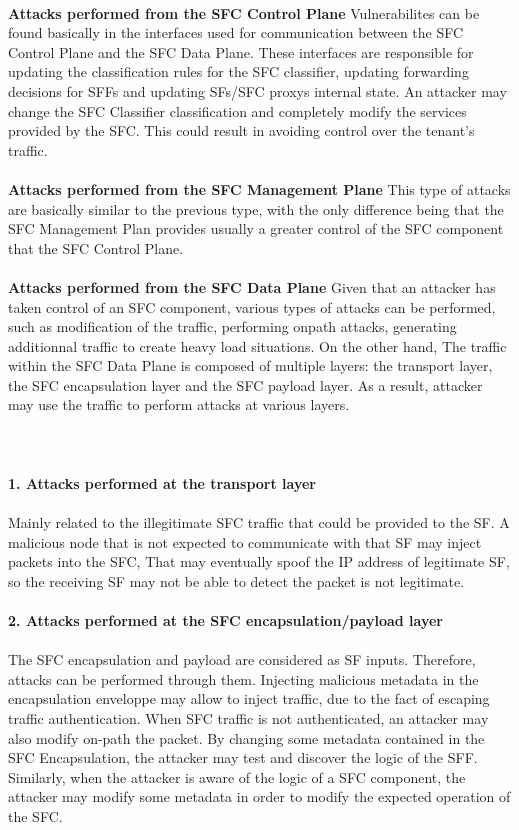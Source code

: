\\
\textbf{Attacks performed from the SFC Control Plane}
Vulnerabilites can be found basically in the interfaces used for communication between the SFC Control Plane and the SFC Data Plane. These interfaces are responsible for updating the classification rules for the SFC classifier, updating forwarding decisions for SFFs and updating SFs/SFC proxys internal state. An attacker may change the SFC Classifier classification and
completely modify the services provided by the SFC. This could result in avoiding control over the tenant's traffic.\\
\\
\textbf{Attacks performed from the SFC Management Plane}
This type of attacks are basically similar to the previous type, with the only difference being that the SFC Management Plan provides usually a greater control of the SFC component that the SFC Control Plane.\\
\\
\textbf{Attacks performed from the SFC Data Plane} Given that an attacker has taken control of an SFC component, various types of attacks can be performed, such as modification of the traffic, performing onpath attacks, generating additionnal traffic to create heavy load situations. On the other hand, The traffic within the SFC Data Plane is composed of multiple
layers: the transport layer, the SFC encapsulation layer and the SFC payload layer. As a result, attacker may use the traffic to perform attacks at various layers.\\
\\
\\
\\
\textbf{1. Attacks performed at the transport layer}\\
\\
Mainly related to the illegitimate SFC traffic that could be provided to the SF. A malicious node that is not expected to communicate with that SF may inject packets into the SFC, That may eventually spoof the IP address of legitimate SF, so the receiving SF may not be able to detect the packet is not legitimate.\\
\\
\textbf{2. Attacks performed at the SFC encapsulation/payload layer}\\ 
\\
The SFC encapsulation and payload are considered as SF inputs. Therefore, attacks can be performed through them. Injecting malicious metadata in the encapsulation enveloppe may allow to inject traffic, due to the fact of escaping traffic authentication. When SFC traffic is not authenticated, an attacker may also modify on-path the packet. By changing some metadata contained in the SFC Encapsulation, the attacker may test and discover the logic of the SFF. Similarly, when the attacker is aware of the logic of a SFC component, the attacker may modify some metadata in order to modify the expected operation of the SFC.
\newpage
